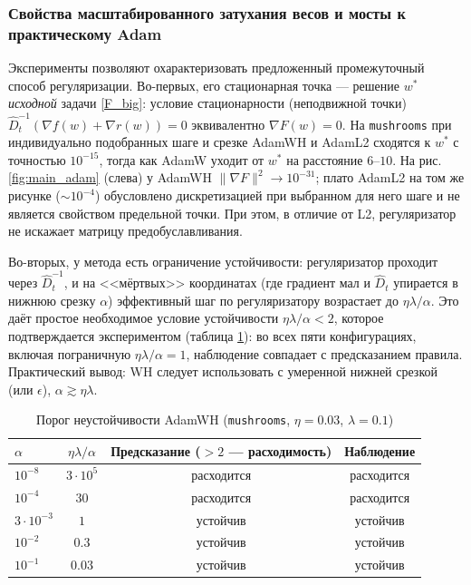 \subsubsection{Свойства масштабированного затухания весов и мосты к практическому Adam}

Эксперименты позволяют охарактеризовать предложенный промежуточный способ регуляризации. Во-первых, его стационарная точка --- решение $w^*$ \emph{исходной} задачи \eqref{F_big}: условие стационарности (неподвижной точки) $\hat D_t^{-1}(\nabla f(w) + \nabla r(w)) = 0$ эквивалентно $\nabla F(w) = 0$. На \texttt{mushrooms} при индивидуально подобранных шаге и срезке AdamWH и AdamL2 сходятся к $w^*$ с точностью $10^{-15}$, тогда как AdamW уходит от $w^*$ на расстояние $6$--$10$. На рис. \ref{fig:main_adam} (слева) у AdamWH $\|\nabla F\|^2 \to 10^{-31}$; плато AdamL2 на том же рисунке ($\sim 10^{-4}$) обусловлено дискретизацией при выбранном для него шаге и не является свойством предельной точки. При этом, в отличие от L2, регуляризатор не искажает матрицу предобуславливания.

Во-вторых, у метода есть ограничение устойчивости: регуляризатор проходит через $\hat D_t^{-1}$, и на <<мёртвых>> координатах (где градиент мал и $\hat D_t$ упирается в нижнюю срезку $\alpha$) эффективный шаг по регуляризатору возрастает до $\eta\lambda/\alpha$. Это даёт простое необходимое условие устойчивости $\eta\lambda/\alpha < 2$, которое подтверждается экспериментом (таблица \ref{tab:wh}): во всех пяти конфигурациях, включая пограничную $\eta\lambda/\alpha = 1$, наблюдение совпадает с предсказанием правила. Практический вывод: WH следует использовать с умеренной нижней срезкой (или $\epsilon$), $\alpha \gtrsim \eta\lambda$.

\begin{table}[h!]
\centering
\caption{Порог неустойчивости AdamWH (\texttt{mushrooms}, $\eta = 0.03$, $\lambda = 0.1$)}
\label{tab:wh}
\begin{tabular}{lccc}
\toprule
$\alpha$ & $\eta\lambda/\alpha$ & Предсказание ($>2$ --- расходимость) & Наблюдение \\
\midrule
$10^{-8}$ & $3\cdot10^{5}$ & расходится & расходится \\
$10^{-4}$ & $30$ & расходится & расходится \\
$3\cdot10^{-3}$ & $1$ & устойчив & устойчив \\
$10^{-2}$ & $0.3$ & устойчив & устойчив \\
$10^{-1}$ & $0.03$ & устойчив & устойчив \\
\bottomrule
\end{tabular}
\end{table}

